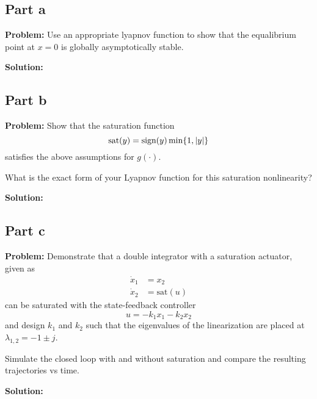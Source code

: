 \documentclass[letter]{article}
\begin{document}
\subsection{Part a}
\textbf{Problem:}
Use an appropriate lyapnov function to show that the equalibrium point at $x=0$ is globally asymptotically stable.

\noindent
\textbf{Solution:}











\subsection{Part b}
\textbf{Problem:}
Show that the saturation function $$\text{sat}(y) = \text{sign}(y) \min \{1, \abs{y}\}$$ satisfies the above assumptions for $g(\cdot)$.

What is the exact form of your Lyapnov function for this saturation nonlinearity?

\noindent
\textbf{Solution:}










\newpage
\subsection{Part c}
\textbf{Problem:}
Demonstrate that a double integrator with a saturation actuator, given as
\begin{equation}
	\begin{aligned}
		\dot{x}_1 &= x_2\\
		\dot{x}_2 &= \text{sat}(u)
	\end{aligned}
\end{equation}
can be saturated with the state-feedback controller $$ u = -k_1 x_1 - k_2 x_2$$ and design $k_1$ and $k_2$ such that the eigenvalues of the linearization are placed at $\lambda_{1,2} = -1 \pm j$.

Simulate the closed loop with and without saturation and compare the resulting trajectories vs time.

\noindent
\textbf{Solution:}
\end{document}

